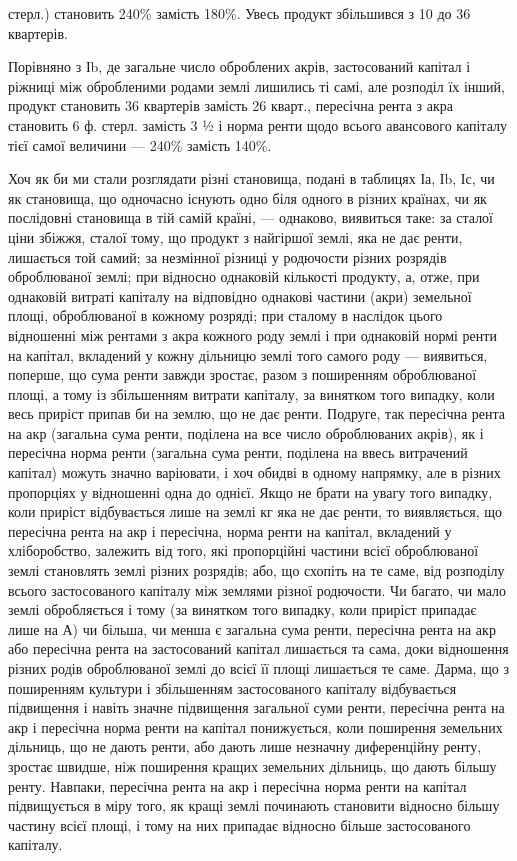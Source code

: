 \parcont{}  %
стерл.) становить 240\% замість 180\%. Увесь продукт збільшився з 10 до
36 квартерів.

Порівняно з Іb, де загальне число оброблених акрів, застосований капітал
і ріжниці між обробленими родами землі лишились ті самі, але розподіл
їх інший, продукт становить 36 квартерів замість 26 кварт., пересічна рента
з акра становить 6 ф. стерл. замість 3 ½ і норма ренти щодо всього авансового
капіталу тієї самої величини — 240\% замість 140\%.

Хоч як би ми стали розглядати різні становища, подані в таблицях Іа,
Іb, Іс, чи як становища, що одночасно існують одно біля одного в різних країнах,
чи як послідовні становища в тій самій країні, — однаково, виявиться таке:
за сталої ціни збіжжя, сталої тому, що продукт з найгіршої землі, яка не дає
ренти, лишається той самий; за незмінної різниці у родючости різних розрядів
оброблюваної землі; при відносно однаковій кількості продукту, а, отже,
при однаковій витраті капіталу на відповідно однакові частини (акри) земельної
площі, оброблюваної в кожному розряді; при сталому в наслідок цього
відношенні між рентами з акра кожного роду землі і при однаковій нормі ренти
на капітал, вкладений у кожну дільницю землі того самого роду — виявиться,
поперше, що сума ренти завжди зростає, разом з поширенням оброблюваної
площі, а тому із збільшенням витрати капіталу, за винятком того випадку, коли
весь приріст припав би на землю, що не дає ренти. Подруге, так пересічна
рента на акр (загальна сума ренти, поділена на все число оброблюваних
акрів), як і пересічна норма ренти (загальна сума ренти, поділена на ввесь
витрачений капітал) можуть значно варіювати, і хоч обидві в одному напрямку,
але в різних пропорціях у відношенні одна до однієї. Якщо не брати
на увагу того випадку, коли приріст відбувається лише на землі кг
яка не дає ренти, то виявляється, що пересічна рента на акр і пересічна,
норма ренти на капітал, вкладений у хліборобство, залежить від того, які пропорційні
частини всієї оброблюваної землі становлять землі різних розрядів;
або, що схопіть на те саме, від розподілу всього застосованого капіталу між
землями різної родючости. Чи багато, чи мало землі обробляється і тому (за
винятком того випадку, коли приріст припадає лише на А) чи більша, чи
менша є загальна сума ренти, пересічна рента на акр або пересічна рента на
застосований капітал лишається та сама, доки відношення різних родів оброблюваної
землі до всієї її площі лишається те саме. Дарма, що з поширенням
культури і збільшенням застосованого капіталу відбувається підвищення і
навіть значне підвищення загальної суми ренти, пересічна рента на акр і
пересічна норма ренти на капітал понижується, коли поширення земельних
дільниць, що не дають ренти, або дають лише незначну диференційну ренту,
зростає швидше, ніж поширення кращих земельних дільниць, що дають більшу
ренту. Навпаки, пересічна рента на акр і пересічна норма ренти на капітал підвищується в міру того,
як кращі землі починають становити відносно більшу
частину всієї площі, і тому на них припадає відносно більше застосованого
капіталу.

